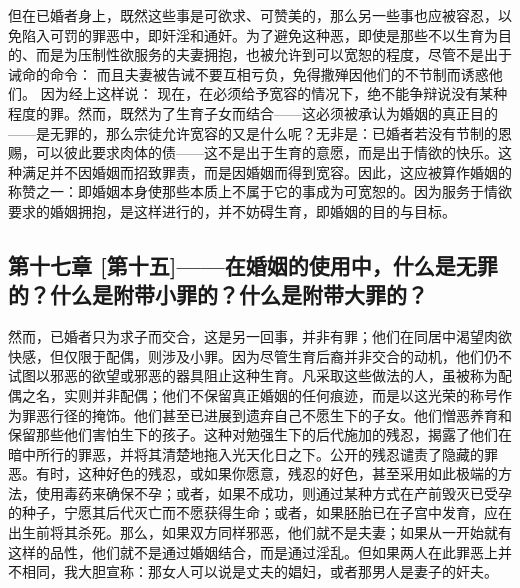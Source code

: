 但在已婚者身上，既然这些事是可欲求、可赞美的，那么另一些事也应被容忍，以免陷入可罚的罪恶中，即奸淫和通奸。为了避免这种恶，即使是那些不以生育为目的、而是为压制性欲服务的夫妻拥抱，也被允许到可以宽恕的程度，尽管不是出于诫命的命令：\newline{}\newline{} 而且夫妻被告诫不要互相亏负，免得撒殚因他们的不节制而诱惑他们。\newline{}\newline{} 因为经上这样说：\newline{}\newline{} 现在，在必须给予宽容的情况下，绝不能争辩说没有某种程度的罪。然而，既然为了生育子女而结合——这必须被承认为婚姻的真正目的——是无罪的，那么宗徒允许宽容的又是什么呢？无非是：已婚者若没有节制的恩赐，可以彼此要求肉体的债——这不是出于生育的意愿，而是出于情欲的快乐。这种满足并不因婚姻而招致罪责，而是因婚姻而得到宽容。因此，这应被算作婚姻的称赞之一：即婚姻本身使那些本质上不属于它的事成为可宽恕的。因为服务于情欲要求的婚姻拥抱，是这样进行的，并不妨碍生育，即婚姻的目的与目标。\par


\subsection{第十七章 [第十五]——在婚姻的使用中，什么是无罪的？什么是附带小罪的？什么是附带大罪的？}

然而，已婚者只为求子而交合，这是另一回事，并非有罪；他们在同居中渴望肉欲快感，但仅限于配偶，则涉及小罪。因为尽管生育后裔并非交合的动机，他们仍不试图以邪恶的欲望或邪恶的器具阻止这种生育。凡采取这些做法的人，虽被称为配偶之名，实则并非配偶；他们不保留真正婚姻的任何痕迹，而是以这光荣的称号作为罪恶行径的掩饰。他们甚至已进展到遗弃自己不愿生下的子女。他们憎恶养育和保留那些他们害怕生下的孩子。这种对勉强生下的后代施加的残忍，揭露了他们在暗中所行的罪恶，并将其清楚地拖入光天化日之下。公开的残忍谴责了隐藏的罪恶。有时，这种好色的残忍，或如果你愿意，残忍的好色，甚至采用如此极端的方法，使用毒药来确保不孕；或者，如果不成功，则通过某种方式在产前毁灭已受孕的种子，宁愿其后代灭亡而不愿获得生命；或者，如果胚胎已在子宫中发育，应在出生前将其杀死。那么，如果双方同样邪恶，他们就不是夫妻；如果从一开始就有这样的品性，他们就不是通过婚姻结合，而是通过淫乱。但如果两人在此罪恶上并不相同，我大胆宣称：那女人可以说是丈夫的娼妇，或者那男人是妻子的奸夫。\par

